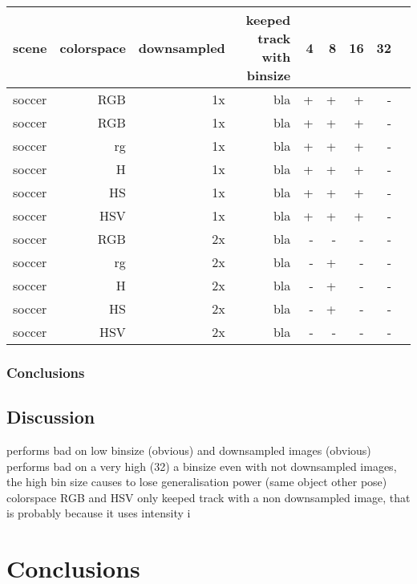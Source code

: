 \documentclass[a4paper,11pt]{article}
\begin{document}
	\begin{tabular}{l*{8}{r|}}
		scene	& 	colorspace	& downsampled & keeped track with binsize & 4 & 8 & 16 & 32\\
		\hline
		soccer 	& 	RGB	 		& 1x		  &			bla				  & + & + & +  &  -\\
		soccer 	& 	RGB	 		& 1x		  &			bla				  & + & + & +  &  -\\
		soccer 	& 	rg	 		& 1x 		  &			bla				  & + & + & +  &  -\\
		soccer 	& 	H	 		& 1x		  &			bla				  & + & + & +  &  -\\
		soccer 	& 	HS	 		& 1x		  &			bla				  & + & + & +  &  -\\
		soccer 	& 	HSV	 		& 1x		  &			bla				  & + & + & +  &  -\\
		soccer 	& 	RGB	 		& 2x		  &			bla				  & - & - & -  &  -\\
		soccer 	& 	rg	 		& 2x 		  &			bla				  & - & + & -  &  -\\
		soccer 	& 	H	 		& 2x		  &			bla				  & - & + & -  &  -\\
		soccer 	& 	HS	 		& 2x		  &			bla				  & - & + & -  &  -\\
		soccer 	& 	HSV	 		& 2x		  &			bla				  & - & - & -  &  -\\
	\end{tabular}	

\subsubsection{Conclusions}

\subsection{Discussion} %
performs bad on low binsize (obvious) and downsampled images (obvious)\\

performs bad on a very high (32) a binsize even with not downsampled
images, the high bin size causes to lose generalisation power (same object other pose)\\
		
colorspace RGB and HSV only keeped track with a non downsampled image,
that is probably because it uses intensity i


\section{Conclusions} \label{sec:conc}
\end{document}

